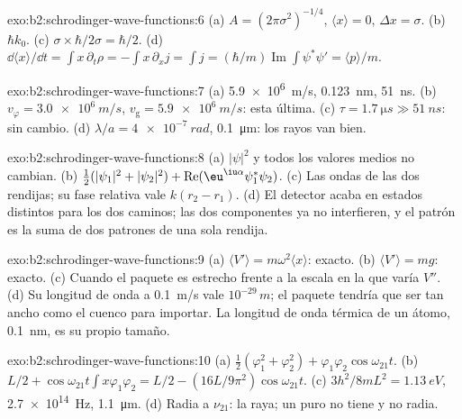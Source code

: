 \begin{solution}{exo:b2:schrodinger-wave-functions:6}
(a) $A = (2\pi\sigma^2)^{-1/4}$, $\langle x\rangle = 0$, $\Delta x = \sigma$. (b) $\hbar k_0$.
(c) $\sigma \times \hbar/2\sigma = \hbar/2$. (d) $\dd\langle x\rangle/\dd t = \int x\,
\partial_t\rho = -\int x\,\partial_xj = \int j = (\hbar/m)\operatorname{Im}\int\psi^*
\psi' = \langle p\rangle/m$.
\end{solution}

\begin{solution}{exo:b2:schrodinger-wave-functions:7}
(a) \qty{5.9e6}{m/s}, \qty{0.123}{nm}, \qty{51}{ns}. (b) $v_\varphi = \qty{3.0e6}{m/s}$,
$v_{\text{g}} = \qty{5.9e6}{m/s}$: esta última. (c) $\tau = \qty{1.7}{\micro s} \gg
\qty{51}{ns}$: sin cambio. (d) $\lambda/a = \qty{4e-7}{rad}$, \qty{0.1}{\micro m}:
los rayos van bien.
\end{solution}

\begin{solution}{exo:b2:schrodinger-wave-functions:8}
(a) $|\psi|^2$ y todos los valores medios no cambian. (b) $\tfrac12(|\psi_1|^2
+ |\psi_2|^2) + \operatorname{Re}(\eu^{\iu\alpha}\psi_1^*\psi_2)$. (c) Las ondas de
las dos rendijas; su fase relativa vale $k(r_2 - r_1)$. (d) El detector
acaba en estados distintos para los dos caminos; las dos componentes ya
no interfieren, y el patrón es la suma de dos patrones de una sola
rendija.
\end{solution}

\begin{solution}{exo:b2:schrodinger-wave-functions:9}
(a) $\langle V'\rangle = m\omega^2\langle x\rangle$: exacto. (b) $\langle V'\rangle
= mg$: exacto. (c) Cuando el paquete es estrecho frente a la escala en la que
varía $V''$. (d) Su longitud de onda a \qty{0.1}{m/s} vale $10^{-29}\,\unit{m}$; el
paquete tendría que ser tan ancho como el cuenco para importar. La longitud de onda
térmica de un átomo, \qty{0.1}{nm}, es su propio tamaño.
\end{solution}

\begin{solution}{exo:b2:schrodinger-wave-functions:10}
(a) $\tfrac12(\varphi_1^2 + \varphi_2^2) + \varphi_1\varphi_2\cos\omega_{21}t$. (b) $L/2 +
\cos\omega_{21}t\int x\varphi_1\varphi_2 = L/2 - (16L/9\pi^2)\cos\omega_{21}t$. (c)
$3h^2/8mL^2 = \qty{1.13}{eV}$, \qty{2.7e14}{Hz}, \qty{1.1}{\micro m}. (d) Radia
a $\nu_{21}$: la raya; un  puro no tiene  y no radia.
\end{solution}


